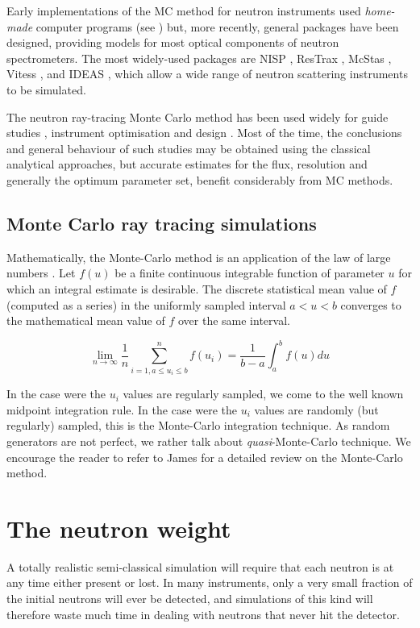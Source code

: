 Early implementations of the MC method for neutron instruments used \emph{home-made} computer programs  (see \cite{Copley86,Mildner77}) but, more recently, general packages have been designed, providing models for most optical components of neutron spectrometers.
The most widely-used packages are NISP \cite{NISP}, ResTrax \cite{Restrax}, McStas \cite{nn_10_20,mcstas_webpage}, Vitess \cite{Vitess}, and IDEAS \cite{IDEAS}, which allow a wide range of neutron scattering instruments to be simulated.

The neutron ray-tracing Monte Carlo method has been used widely for guide studies \cite{Copley93,Farhi02,Schanzer04}, instrument optimisation and design \cite{Zsigmond04,Lieutenant05}. Most of the time, the conclusions and general behaviour of such studies may be obtained using the classical analytical approaches, but accurate estimates for the flux, resolution and generally the optimum parameter set, benefit considerably from MC methods.

\subsection{Monte Carlo ray tracing simulations}
Mathematically, the Monte-Carlo method is an application of the law of large numbers \cite{James80,Grimmett92}. Let $f(u)$ be a finite continuous integrable function of parameter $u$ for which an integral estimate is desirable. The discrete statistical mean value of $f$ (computed as a series) in the uniformly sampled interval $a < u < b$ converges to the mathematical mean value of $f$ over the same interval.

\begin{equation}
\lim_{n \rightarrow \infty} \frac{1}{n} \sum_{i=1, a \leq u_i \leq b}^n f(u_i) = \frac{1}{b-a}\int_a^b f(u) du
\end{equation}

In the case were the $u_i$ values are regularly sampled, we come to the well known midpoint integration rule. In the case were the $u_i$ values are randomly (but regularly) sampled, this is the Monte-Carlo integration technique. As random generators are not perfect, we rather talk about \emph{quasi}-Monte-Carlo technique. We encourage the reader to refer to James \cite{James80} for a detailed review on the Monte-Carlo method.

\section{The neutron weight}
\label{s:probweight}
A totally realistic semi-classical simulation will require that
each neutron is at any time either present or lost.
In many instruments, only a very
small fraction of the initial neutrons will ever be detected, and
simulations of this kind will therefore waste much time in dealing
with neutrons that never hit the detector.

